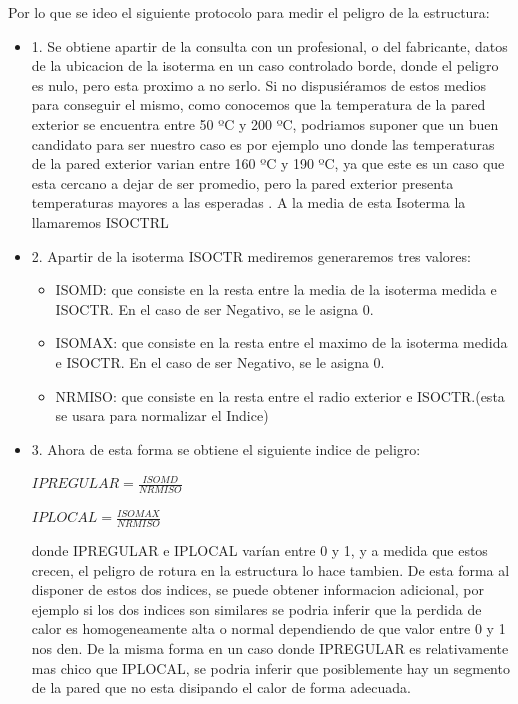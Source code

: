 \documentclass[12pt,a4paper]{article}
\begin{document}
Por lo que se ideo el siguiente protocolo para medir el peligro de la estructura:
	\begin{itemize}
		\item 1. Se obtiene apartir de la consulta con un profesional, o del fabricante, datos de la ubicacion de la isoterma en un caso controlado borde, donde el peligro es nulo, pero esta proximo a no serlo. Si no dispusiéramos de estos medios para conseguir el mismo, como conocemos que la temperatura de la pared exterior se encuentra entre 50 ºC y 200 ºC, podriamos suponer que un buen candidato para ser nuestro caso es por ejemplo uno donde las temperaturas de la pared exterior varian entre 160 ºC y 190 ºC, ya que este es un caso que esta cercano a dejar de ser promedio, pero la pared exterior presenta temperaturas mayores a las esperadas . A la media de esta Isoterma la llamaremos ISOCTRL
        \item 2. Apartir de la isoterma ISOCTR mediremos generaremos tres valores:
		\begin{itemize}
			\item ISOMD: que consiste en la resta entre la media de la isoterma medida e ISOCTR. En el caso de ser Negativo, se le asigna 0.
            \item ISOMAX: que consiste en la resta entre el maximo de la isoterma medida e ISOCTR. En el caso de ser Negativo, se le asigna 0.
            \item NRMISO: que consiste en la resta entre el radio exterior e ISOCTR.(esta se usara para normalizar el Indice)
    	\end{itemize}
        \item 3. Ahora de esta forma se obtiene el siguiente indice de peligro:
        
        $IPREGULAR = \frac{ISOMD}{NRMISO}$
        
        
        $IPLOCAL = \frac{ISOMAX}{NRMISO}$
        
        donde IPREGULAR e IPLOCAL varían entre 0 y 1, y a medida que estos crecen, el peligro de rotura en la estructura lo hace tambien.
        De esta forma al disponer de estos dos indices, se puede obtener informacion adicional, por ejemplo si los dos indices son similares se podria inferir que la perdida de calor es homogeneamente alta o normal dependiendo de que valor entre 0 y 1 nos den. De la misma forma en un caso donde IPREGULAR es relativamente mas chico que IPLOCAL, se podria inferir que posiblemente hay un segmento de la pared que no esta disipando el calor de forma adecuada. 
	\end{itemize}
    
\end{document}
